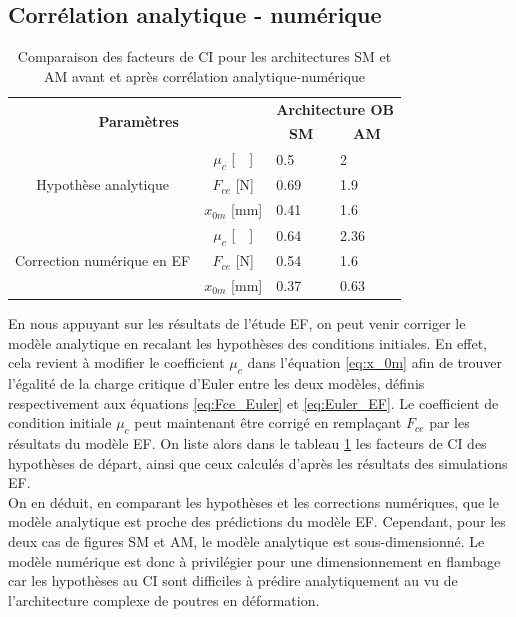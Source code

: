 		\subsection{Corrélation analytique - numérique} 
\begin{table}[!htbp]
	\centering
		\begin{tabular}[t]{|c|c|m{1cm}|m{1cm}|}
\hline
\multicolumn{2}{|c|}{\multirow{2}{*}{\textbf{Paramètres}}} & \multicolumn{2}{c|}{\textbf{Architecture OB}}\\
\cline{3-4} 
\multicolumn{2}{|c|}{} &
 \multicolumn{1}{c|}{\textbf{SM}} &
  \multicolumn{1}{c|}{\textbf{AM}} \\
\hline \hline
\multirow{3}{*}{Hypothèse analytique} &  $\mu_c$ [~~]	& 0.5  & 2  \\
\cline{2-4} 
									  &  $F_{ce}$ [N]  & 0.69 & 1.9 \\\cline{2-4} 
									  &  $x_{0m}$ [mm]  & 0.41 & 1.6 \\

\hline
\multirow{3}{*}{Correction numérique en EF} & $\mu_c$ [~~]  & 0.64 & 2.36 \\
\cline{2-4} 
									 		& $F_{ce}$ [N]  & 0.54 & 1.6 \\	\cline{2-4} 
										    & $x_{0m}$ [mm] & 0.37 & 0.63 \\
									   
\hline
		\end{tabular}
        \caption{Comparaison des facteurs de CI pour les architectures SM et AM avant et après corrélation analytique-numérique}
        \label{tab:corection_CI_flambement}
\end{table}        
En nous appuyant sur les résultats de l'étude EF, on peut venir corriger le modèle analytique en recalant les hypothèses des conditions initiales. En effet, cela revient à modifier le coefficient $\mu_c$ dans l'équation \ref{eq:x_0m} afin de trouver l'égalité de la charge critique d'Euler entre les deux modèles, définis respectivement aux équations \ref{eq:Fce_Euler} et  \ref{eq:Euler_EF}. Le coefficient de condition initiale $\mu_c$ peut maintenant être corrigé en remplaçant $F_{ce}$ par les résultats du modèle EF. On liste alors dans le tableau \ref{tab:corection_CI_flambement} les facteurs de CI des hypothèses de départ, ainsi que ceux calculés d'après les résultats des simulations EF. \\
On en déduit, en comparant les hypothèses et les corrections numériques, que le modèle analytique est proche des prédictions du modèle EF. Cependant, pour les deux cas de figures SM et AM, le modèle analytique est sous-dimensionné. Le modèle numérique est donc à privilégier pour une dimensionnement en flambage car les hypothèses au CI sont difficiles à prédire analytiquement au vu de l'architecture complexe de poutres en déformation.
		